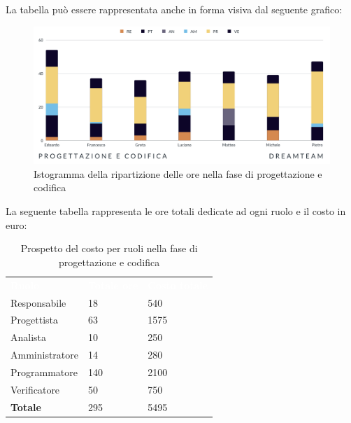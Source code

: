 La tabella può essere rappresentata anche in forma visiva dal seguente grafico:
\begin{figure}[H]
\centering
\includegraphics[scale=0.65]{Sezioni/SezioniPreventivo/grafici/Progettazione_codifica.png}
\caption{Istogramma della ripartizione delle ore nella fase di progettazione e codifica}
\end{figure}

La seguente tabella rappresenta le ore totali dedicate ad ogni ruolo e il costo in euro:

\begin{table}[H]
\begin{center}
\renewcommand{\arraystretch}{1.5}
\begin{tabular}{ m{}<{\centering}  m{}<{\centering} m{}<{\centering}}
	\rowcolor{darkblue}
	\textcolor{white}{\textbf{Ruolo}}&\textcolor{white}{\textbf{Totale ore}}&\textcolor{white}{\textbf{Costo totale}}\\ 

	Responsabile  & 18 & 540 \\	
	
	Progettista & 63 & 1575 \\
	
	Analista & 10 & 250 \\

	Amministratore & 14 & 280 \\
	
	Programmatore & 140 & 2100 \\
	
	Verificatore & 50 & 750 \\
	
	\textbf{Totale} & 295 & 5495 \\
	
\end{tabular}
\caption{Prospetto del costo per ruoli nella fase di progettazione e codifica}
\end{center}
\end{table}

